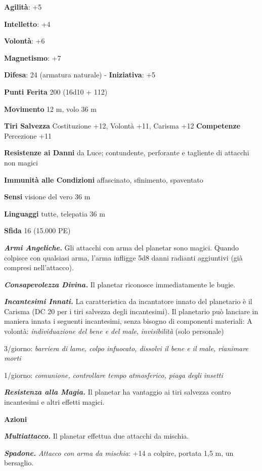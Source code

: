 \begin{multicols}{2}
\textbf{Agilità}: +5

\textbf{Intelletto}: +4

\textbf{Volontà}: +6

\textbf{Magnetismo}: +7

\textbf{Difesa}: 24 (armatura naturale) - \textbf{Iniziativa}: +5

\textbf{Punti Ferita} 200 (16d10 + 112)

\textbf{Movimento} 12 m, volo 36 m

\textbf{Tiri Salvezza} Costituzione +12, Volontà +11, Carisma +12
\textbf{Competenze} Percezione +11

\textbf{Resistenze ai Danni} da Luce; contundente, perforante e
tagliente di attacchi non magici

\textbf{Immunità alle Condizioni} affascinato, sfinimento, spaventato

\textbf{Sensi} visione del vero 36 m

\textbf{Linguaggi} tutte, telepatia 36 m

\textbf{Sfida} 16 (15.000 PE)

\emph{\textbf{Armi Angeliche.}} Gli attacchi con arma del planetar sono
magici. Quando colpisce con qualsiasi arma, l'arma infligge 5d8 danni
radianti aggiuntivi (già compresi nell'attacco).

\emph{\textbf{Consapevolezza Divina.}} Il planetar riconosce
immediatamente le bugie.

\emph{\textbf{Incantesimi Innati.}} La caratteristica da incantatore
innato del planetario è il Carisma (DC 20 per i tiri salvezza degli
incantesimi). Il planetario può lanciare in maniera innata i seguenti
incantesimi, senza bisogno di componenti materiali: A volontà:
\emph{individuazione del bene e del male}, \emph{invisibilità} (solo
personale)

3/giorno: \emph{barriera di lame, colpo infuocato, dissolvi il bene e
il} \emph{male, rianimare morti}

1/giorno: \emph{comunione, controllare tempo atmosferico, piaga degli}
\emph{insetti}

\emph{\textbf{Resistenza alla Magia.}} Il planetar ha vantaggio ai tiri
salvezza contro incantesimi e altri effetti magici.

\textbf{Azioni}

\emph{\textbf{Multiattacco.}} Il planetar effettua due attacchi da
mischia.

\emph{\textbf{Spadone.} Attacco con arma da mischia}: +14 a colpire,
portata 1,5 m, un bersaglio.


\end{multicols}
